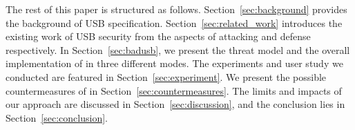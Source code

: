 The rest of this paper is structured as follows.  Section~\ref{sec:background}
provides the background of USB specification.  Section~\ref{sec:related_work}
introduces the existing work of USB security from the aspects of attacking and
defense respectively.  In Section~\ref{sec:badusb}, we present the threat model
and the overall implementation of \tool in three different modes.  The
experiments and user study we conducted are featured in
Section~\ref{sec:experiment}.  We present the possible countermeasures of \tool
in Section~\ref{sec:countermeasures}.  The limits and impacts of our approach
are discussed in Section~\ref{sec:discussion}, and the conclusion lies in
Section~\ref{sec:conclusion}.















